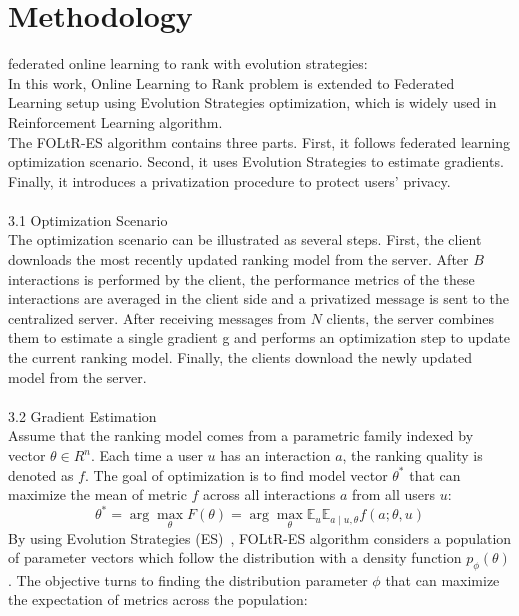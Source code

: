 
\section{Methodology}


federated online learning to rank with evolution strategies:\\
In this work, Online Learning to Rank problem is extended to Federated Learning setup using Evolution Strategies optimization, which is widely used in Reinforcement Learning algorithm.\\
The FOLtR-ES algorithm contains three parts. First, it follows federated learning optimization scenario. Second, it uses Evolution Strategies to estimate gradients. Finally, it introduces a privatization procedure to protect users' privacy.\\
\\
3.1 Optimization Scenario\\
The optimization scenario can be illustrated as several steps. First, the client downloads the most recently updated ranking model from the server. After $B$ interactions is performed by the client, the performance metrics of the these interactions are averaged in the client side and a privatized message is sent to the centralized server. After receiving messages from $N$ clients, the server combines them to estimate a single gradient g and performs an optimization step to update the current ranking model. Finally, the clients download the newly updated model from the server.\\
\\
3.2 Gradient Estimation\\
Assume that the ranking model comes from a parametric family indexed by vector $\theta \in R^{n}$. Each time a user $u$ has an interaction $a$, the ranking quality is denoted as $f$. The goal of optimization is to find model vector $\theta^*$ that can maximize the mean of metric $f$ across all interactions $a$ from all users $u$:\\
\begin{equation}
	\theta^{*}=\arg \max _{\theta} F(\theta)=\arg \max _{\theta} \mathbb{E}_{u} \mathbb{E}_{a \mid u, \theta} f(a ; \theta, u)
\end{equation}
By using Evolution Strategies (ES)~\cite{salimans2017evolution}, FOLtR-ES algorithm considers a population of parameter vectors which follow the distribution with a density function $p_{\phi}(\theta)$. The objective turns to finding the distribution parameter $\phi$ that can maximize the expectation of metrics across the population:
